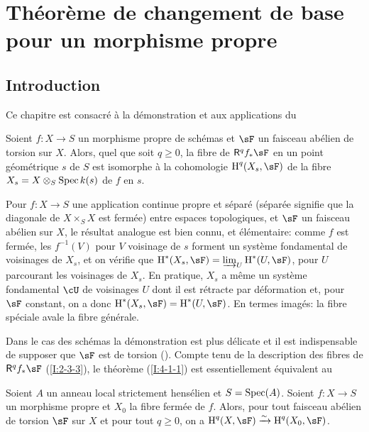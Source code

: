\section{Théorème de changement de base pour un morphisme propre}\label{I:4}










\subsection{Introduction}\label{I:4-1}

Ce chapitre est consacré à la démonstration et aux applications du 





\begin{theorem}\label{I:4-1-1}
Soient $f:X\to S$ un morphisme propre de schémas et $\sF$ un faisceau abélien 
de torsion sur $X$. Alors, quel que soit $q\geqslant 0$, la fibre de 
$\R^q f_* \sF$ en un point géométrique $s$ de $S$ est isomorphe à la 
cohomologie $\h^q(X_s,\sF)$ de la fibre $X_s=X\otimes_S \operatorname{Spec} k(s)$ de $f$ en 
$s$. 
\end{theorem}

Pour $f:X\to S$ une application continue propre et séparé (séparée 
signifie que la diagonale de $X\times_S X$ est fermée) entre espaces 
topologiques, et $\sF$ un faisceau abélien sur $X$, le résultat analogue est 
bien connu, et élémentaire: comme $f$ est fermée, les $f^{-1}(V)$ pour 
$V$ voisinage de $s$ forment un système fondamental de voisinages de $X_s$, et 
on vérifie que $\h^*(X_s,\sF) = \varinjlim_U \h^*(U,\sF)$, pour $U$ parcourant les 
voisinages de $X_s$. En pratique, $X_s$ a même un système fondamental 
$\cU$ de voisinages $U$ dont il est rétracte par déformation et, pour $\sF$ 
constant, on a donc $\h^*(X_s,\sF)=\h^*(U,\sF)$. En termes imagés: la fibre 
spéciale avale la fibre générale. 

Dans le cas des schémas la démonstration est plus délicate et il est 
indispensable de supposer que $\sF$ est de torsion (\cite[XII.2]{sga4}). Compte 
tenu de la description des fibres de $\R^q f_* \sF$ (\ref{I:2-3-3}), le théorème 
(\ref{I:4-1-1}) est essentiellement équivalent au 

 
  
   
    
\begin{theorem}\label{I:4-1-2}
Soient $A$ un anneau local strictement hensélien et $S=\operatorname{Spec}(A)$. Soient 
$f:X\to S$ un morphisme propre et $X_0$ la fibre fermée de $f$. Alors, pour 
tout faisceau abélien de torsion $\sF$ sur $X$ et pour tout $q\geqslant 0$, on 
a $\h^q(X,\sF) \iso \h^q(X_0,\sF)$. 
\end{theorem} 

